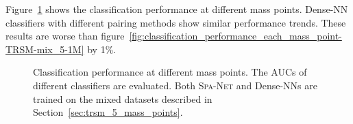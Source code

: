 \documentclass[12pt]{article}
\begin{document}
        Figure~\ref{fig:classification_performance_each_mass_point-TRSM-mix_5-150k} shows the classification performance at different mass points. Dense-NN classifiers with different pairing methods show similar performance trends. These results are worse than figure~\ref{fig:classification_performance_each_mass_point-TRSM-mix_5-1M} by 1\%.  
        \begin{figure}[htpb]
            \centering
            \caption{Classification performance at different mass points. The AUCs of different classifiers are evaluated. Both \textsc{Spa-Net} and Dense-NNs are trained on the mixed datasets described in Section~\ref{sec:trsm_5_mass_points}.}  
            \label{fig:classification_performance_each_mass_point-TRSM-mix_5-150k}  
        \end{figure}
\end{document}
